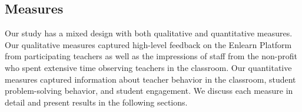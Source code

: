 \documentclass{sigchi}
\begin{document}

\subsection{Measures}
Our study has a mixed design with both qualitative and quantitative measures. Our qualitative measures captured high-level feedback on the Enlearn Platform from participating teachers as well as the impressions of staff from the non-profit who spent extensive time observing teachers in the classroom. Our quantitative measures captured information about teacher behavior in the classroom, student problem-solving behavior, and student engagement. We discuss each measure in detail and present results in the following sections.
\end{document}
